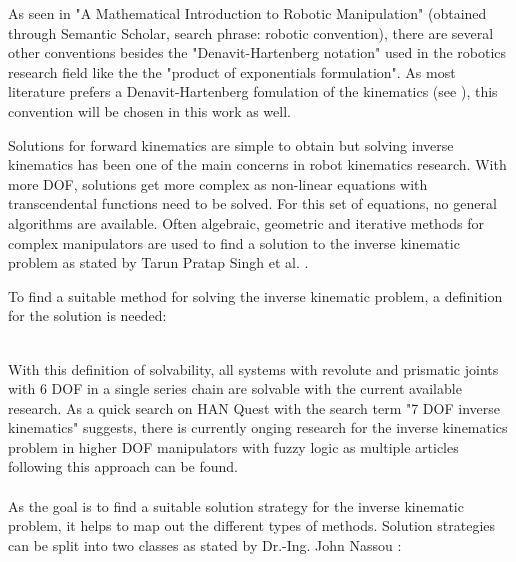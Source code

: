 As seen in "A Mathematical Introduction to Robotic Manipulation" \cite{MathIntroRobManip} (obtained through Semantic Scholar, search phrase: robotic convention), there are several other conventions besides the "Denavit-Hartenberg notation" used in the robotics research field like the the "product of exponentials formulation".
As most literature prefers a Denavit-Hartenberg fomulation of the kinematics (see \cite{MathIntroRobManip}), this convention will be chosen in this work as well.

Solutions for forward  kinematics are simple to obtain but solving inverse kinematics  has  been  one of  the  main  concerns  in  robot kinematics research. 
With more \ac{DOF}, solutions get more complex as non-linear equations with transcendental functions need to be solved. 
For this set of equations, no general algorithms are available.
Often algebraic, geometric and iterative methods for complex manipulators are used to find a solution to the inverse kinematic problem as stated by Tarun Pratap Singh et al. \cite{FwdInvAnalysRobManip}.

To find a suitable method for solving the inverse kinematic problem, a definition for the solution is needed:\\
\medskip
\\
\bigskip

With this definition of solvability, all systems with revolute and prismatic joints with 6 \ac{DOF}  in a single series chain are solvable with the current available research. \cite{invKinSeriallinkMani}
As a quick search on HAN Quest with the search term "7 DOF inverse kinematics" suggests, there is currently onging research for the inverse kinematics problem in higher DOF manipulators with fuzzy logic as multiple articles following this approach can be found.\\
\\

As the goal is to find a suitable solution strategy for the inverse kinematic problem, it helps to map out the different types of methods.
Solution strategies can be split into two classes as stated by Dr.-Ing. John Nassou \cite{invKinSeriallinkMani}:\\
\medskip


